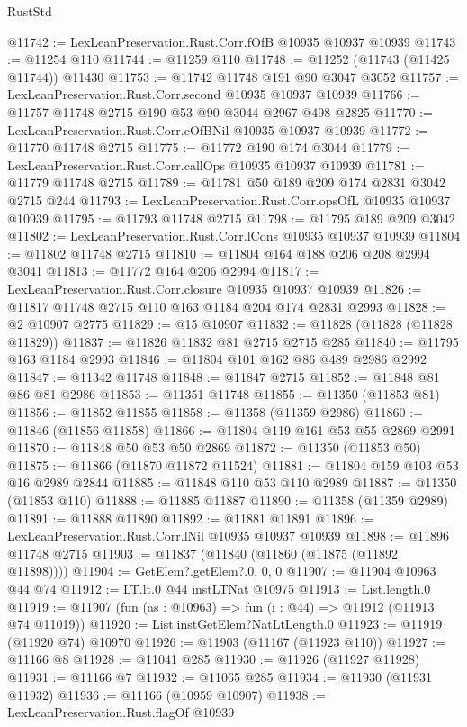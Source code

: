 \begin{lexlean}{RustStd}
\begin{coremodule}
{\begin{coremodule}
{{{{{{{{{{{{{{{{{{{{{{{{{{{{{{{{{@11742 := LexLeanPreservation.Rust.Corr.fOfB @10935 @10937 @10939
@11743 := @11254 @110
@11744 := @11259 @110
@11748 := @11252 (@11743 (@11425 @11744)) @11430
@11753 := @11742 @11748 @191 @90 @3047 @3052
@11757 := LexLeanPreservation.Rust.Corr.second @10935 @10937 @10939
@11766 := @11757 @11748 @2715 @190 @53 @90 @3044 @2967 @498 @2825
@11770 := LexLeanPreservation.Rust.Corr.eOfBNil @10935 @10937 @10939
@11772 := @11770 @11748 @2715
@11775 := @11772 @190 @174 @3044
@11779 := LexLeanPreservation.Rust.Corr.callOps @10935 @10937 @10939
@11781 := @11779 @11748 @2715
@11789 := @11781 @50 @189 @209 @174 @2831 @3042 @2715 @244
@11793 := LexLeanPreservation.Rust.Corr.opsOfL @10935 @10937 @10939
@11795 := @11793 @11748 @2715
@11798 := @11795 @189 @209 @3042
@11802 := LexLeanPreservation.Rust.Corr.lCons @10935 @10937 @10939
@11804 := @11802 @11748 @2715
@11810 := @11804 @164 @188 @206 @208 @2994 @3041
@11813 := @11772 @164 @206 @2994
@11817 := LexLeanPreservation.Rust.Corr.closure @10935 @10937 @10939
@11826 := @11817 @11748 @2715 @110 @163 @1184 @204 @174 @2831 @2993
@11828 := @2 @10907 @2775
@11829 := @15 @10907
@11832 := @11828 (@11828 (@11828 @11829))
@11837 := @11826 @11832 @81 @2715 @2715 @285
@11840 := @11795 @163 @1184 @2993
@11846 := @11804 @101 @162 @86 @489 @2986 @2992
@11847 := @11342 @11748
@11848 := @11847 @2715
@11852 := @11848 @81 @86 @81 @2986
@11853 := @11351 @11748
@11855 := @11350 (@11853 @81)
@11856 := @11852 @11855
@11858 := @11358 (@11359 @2986)
@11860 := @11846 (@11856 @11858)
@11866 := @11804 @119 @161 @53 @55 @2869 @2991
@11870 := @11848 @50 @53 @50 @2869
@11872 := @11350 (@11853 @50)
@11875 := @11866 (@11870 @11872 @11524)
@11881 := @11804 @159 @103 @53 @16 @2989 @2844
@11885 := @11848 @110 @53 @110 @2989
@11887 := @11350 (@11853 @110)
@11888 := @11885 @11887
@11890 := @11358 (@11359 @2989)
@11891 := @11888 @11890
@11892 := @11881 @11891
@11896 := LexLeanPreservation.Rust.Corr.lNil @10935 @10937 @10939
@11898 := @11896 @11748 @2715
@11903 := @11837 (@11840 (@11860 (@11875 (@11892 @11898))))
@11904 := GetElem?.getElem?.{0, 0, 0}
@11907 := @11904 @10963 @44 @74
@11912 := LT.lt.{0} @44 instLTNat @10975
@11913 := List.length.{0}
@11919 := @11907 (fun (as : @10963) => fun (i : @44) => @11912 (@11913 @74 @11019))
@11920 := List.instGetElem?NatLtLength.{0}
@11923 := @11919 (@11920 @74) @10970
@11926 := @11903 (@11167 (@11923 @110))
@11927 := @11166 @8
@11928 := @11041 @285
@11930 := @11926 (@11927 @11928)
@11931 := @11166 @7
@11932 := @11065 @285
@11934 := @11930 (@11931 @11932)
@11936 := @11166 (@10959 @10907)
@11938 := LexLeanPreservation.Rust.flagOf @10939
}}}}}}}}}}}}}}}}}}}}}}}}}}}}}}}}}
\end{coremodule}}
\end{coremodule}
\end{lexlean}
